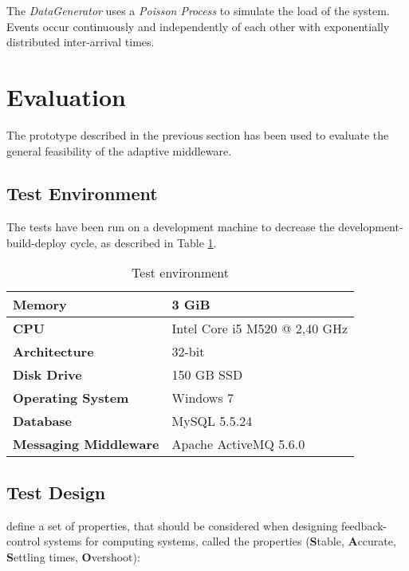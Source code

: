 The \emph{DataGenerator} uses a \emph{Poisson Process} to simulate the load of the system. Events occur continuously and independently of each other with exponentially distributed inter-arrival times.

\section{Evaluation}
\label{sec:ch05_evaluation}

The prototype described in the previous section has been used to evaluate the general feasibility of the adaptive middleware.

\subsection{Test Environment}

The tests have been run on a development machine to decrease the development-build-deploy cycle, as described in Table \ref{table:ch05_test_environment}.

\begin{table}[htbp]
	\centering
	\begin{tabularx}{\textwidth}{@{} l X @{}}
		\caption{Test environment} \label{table:ch05_test_environment} \\
		\toprule
		\bfseries Memory & 3 GiB\\
		\midrule
		\bfseries CPU & Intel Core i5 M520 @ 2,40 GHz \\
		\midrule
		\bfseries Architecture & 32-bit\\
		\midrule
		\bfseries Disk Drive & 150 GB SSD\\
		\midrule
		\bfseries Operating System & Windows 7\\
		\midrule 
		\bfseries Database & MySQL 5.5.24\\
		\midrule
		\bfseries Messaging Middleware & Apache ActiveMQ 5.6.0\\
		\bottomrule
	\end{tabularx}
\end{table}

\subsection{Test Design}

\cite{Abdelzaher:2008ub} define a set of properties, that should be considered when designing feedback-control systems for computing systems, called the  properties (\textbf{S}table, \textbf{A}ccurate, \textbf{S}ettling times, \textbf{O}vershoot):

